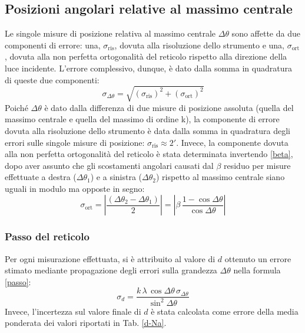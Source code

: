 \documentclass[]{article}
\let\oldsubsection\subsection%
\renewcommand{\subsection}{%
	\renewcommand{\theequation}{\thesubsection.\arabic{equation}}%
	\oldsubsection}%
\begin{document}
    \subsection{Posizioni angolari relative al massimo centrale}
    Le singole misure di posizione relativa al massimo centrale $\Delta \theta$ sono affette da due componenti di errore: una, $\sigma_{\text{ris}}$, dovuta alla risoluzione dello strumento e una, $\sigma_{\text{ort}}$, dovuta alla non perfetta ortogonalità del reticolo rispetto alla direzione della luce incidente. L'errore complessivo, dunque, è dato dalla somma in quadratura di queste due componenti:
    \begin{equation}
        \label{sigma-delta-theta}
        \sigma_{\Delta \theta} = \sqrt{ (\sigma_{\text{ris}})^2 + (\sigma_{\text{ort}})^2 }
    \end{equation}
    Poiché $\Delta \theta$ è dato dalla differenza di due misure di posizione assoluta (quella del massimo centrale e quella del massimo di ordine k), la componente di errore dovuta alla risoluzione dello strumento è data dalla somma in quadratura degli errori sulle singole misure di posizione: $\sigma_{\text{ris}}\approx 2'$. Invece, la componente dovuta alla non perfetta ortogonalità del reticolo è stata determinata invertendo \ref{beta}, dopo aver assunto che gli scostamenti angolari causati dal $\beta$ residuo per misure effettuate a destra ($\Delta \theta_1$) e a sinistra ($\Delta \theta_2$) rispetto al massimo centrale siano uguali in modulo ma opposte in segno:
    \begin{equation}
        \label{sigma-ort}
        \sigma_{\text{ort}} = \left| \frac{(\Delta \theta_2 - \Delta \theta_1)}{2} \right| = \left| \beta \, \frac{1 - \cos{\Delta \theta}}{\cos{\Delta \theta}} \right|
    \end{equation}

    \subsubsection{Passo del reticolo}
    Per ogni misurazione effettuata, si è attribuito al valore di $d$ ottenuto un errore stimato mediante propagazione degli errori sulla grandezza $\Delta \theta$ nella formula \ref{passo}:
    \begin{equation}
        \label{d-error}
        \sigma_d = \frac{k \, \lambda \, \cos{\Delta\theta} \, \sigma_{\Delta \theta}}{\sin^2{\Delta\theta}}
    \end{equation}
    Invece, l'incertezza sul valore finale di $d$ è stata calcolata come errore della media ponderata dei valori riportati in Tab. \ref{d-Na}.
    \label{par:errore_passo}
\end{document}
